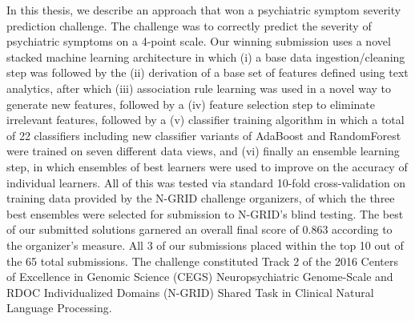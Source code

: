In this thesis, we describe an approach that won a psychiatric symptom severity prediction challenge. The challenge was to correctly predict the severity of psychiatric symptoms on a 4-point scale. Our winning submission uses a novel stacked machine learning architecture in which (i) a base data ingestion/cleaning step was followed by the (ii) derivation of a base set of features defined using text analytics, after which (iii) association rule learning was used in a novel way to generate new features, followed by a (iv) feature selection step to eliminate irrelevant features, followed by a (v) classifier training algorithm in which a total of 22 classifiers including new classifier variants of AdaBoost and RandomForest were trained on seven different data views, and (vi) finally an ensemble learning step, in which ensembles of best learners were used to improve on the accuracy of individual learners. All of this was tested via standard 10-fold cross-validation on training data provided by the N-GRID challenge organizers, of which the three best ensembles were selected for submission to N-GRID's blind testing. The best of our submitted solutions garnered an overall final score of 0.863 according to the organizer's measure. All 3 of our submissions placed within the top 10 out of the 65 total submissions. The challenge constituted Track 2 of the 2016 Centers of Excellence in Genomic Science (CEGS) Neuropsychiatric Genome-Scale and RDOC Individualized Domains (N-GRID) Shared Task in Clinical Natural Language Processing.  
